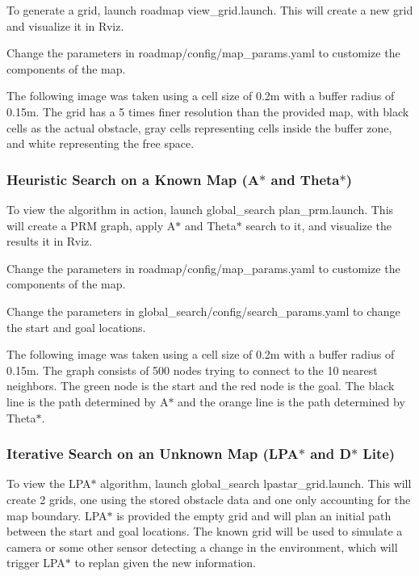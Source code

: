 To generate a grid, launch {\ttfamily roadmap view\+\_\+grid.\+launch}. This will create a new grid and visualize it in Rviz.


\begin{DoxyItemize}
\item Change the parameters in {\ttfamily roadmap/config/map\+\_\+params.\+yaml} to customize the components of the map.
\end{DoxyItemize}

The following image was taken using a cell size of 0.\+2m with a buffer radius of 0.\+15m. The grid has a 5 times finer resolution than the provided map, with black cells as the actual obstacle, gray cells representing cells inside the buffer zone, and white representing the free space.



\subsubsection*{Heuristic Search on a Known Map (A$\ast$ and Theta$\ast$)}

To view the algorithm in action, launch {\ttfamily global\+\_\+search plan\+\_\+prm.\+launch}. This will create a P\+RM graph, apply A$\ast$ and Theta$\ast$ search to it, and visualize the results it in Rviz.


\begin{DoxyItemize}
\item Change the parameters in {\ttfamily roadmap/config/map\+\_\+params.\+yaml} to customize the components of the map.
\item Change the parameters in {\ttfamily global\+\_\+search/config/search\+\_\+params.\+yaml} to change the start and goal locations.
\end{DoxyItemize}

The following image was taken using a cell size of 0.\+2m with a buffer radius of 0.\+15m. The graph consists of 500 nodes trying to connect to the 10 nearest neighbors. The green node is the start and the red node is the goal. The black line is the path determined by A$\ast$ and the orange line is the path determined by Theta$\ast$.



\subsubsection*{Iterative Search on an Unknown Map (L\+P\+A$\ast$ and D$\ast$ Lite)}

To view the L\+P\+A$\ast$ algorithm, launch {\ttfamily global\+\_\+search lpastar\+\_\+grid.\+launch}. This will create 2 grids, one using the stored obstacle data and one only accounting for the map boundary. L\+P\+A$\ast$ is provided the empty grid and will plan an initial path between the start and goal locations. The known grid will be used to simulate a camera or some other sensor detecting a change in the environment, which will trigger L\+P\+A$\ast$ to replan given the new information.


